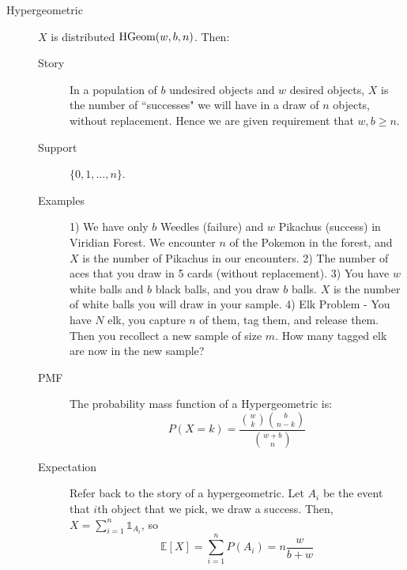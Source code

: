 \documentclass[11pt]{article}
\theoremstyle{definition}
\theoremstyle{remark}
\newcommand{\E}[1]{\mathbb{E}\left[ #1 \right]}
\newcommand{\ind}[1]{\mathds{1}_{#1}}
\newcommand{\HGeom}{\textnormal{HGeom}}
\begin{document}
\begin{description}
\item[Hypergeometric] $X$ is distributed $\HGeom(w, b, n)$. Then:
\begin{description}
	\item[Story] In a population of $b$ undesired objects and $w$ desired objects, $X$ is the number of ``successes" we will have in a draw of $n$ objects, without replacement. Hence we are given requirement that $w,b \geq n$.
	\item[Support] $\{0,1,\ldots,n\}$.
	\item[Examples] 1) We have only $b$ Weedles (failure) and $w$ Pikachus (success) in Viridian Forest. We encounter $n$ of the Pokemon in the forest, and $X$ is the number of Pikachus in our encounters. 2) The number of aces that you draw in 5 cards (without replacement). 3) You have $w$ white balls and $b$ black balls, and you draw $b$ balls. $X$ is the number of white balls you will draw in your sample. 4) Elk Problem - You have $N$ elk, you capture $n$ of them, tag them, and release them. Then you recollect a new sample of size $m$. How many tagged elk are now in the new sample?
	\item[PMF] The probability mass function of a Hypergeometric is:
        \[P(X = k) = \frac{\binom{w}{k}\binom{b}{n-k}}{\binom{w + b}{n}}\]
    \item[Expectation] Refer back to the story of a hypergeometric. Let $A_i$ be the event that $i$th object that we pick, we draw a success. Then, $X = \sum_{i=1}^n \ind{A_i}$, so $$\E{X} = \sum_{i=1}^n P(A_i) = n \frac{w}{b+w}$$
\end{description}
\end{description}
\end{document}
